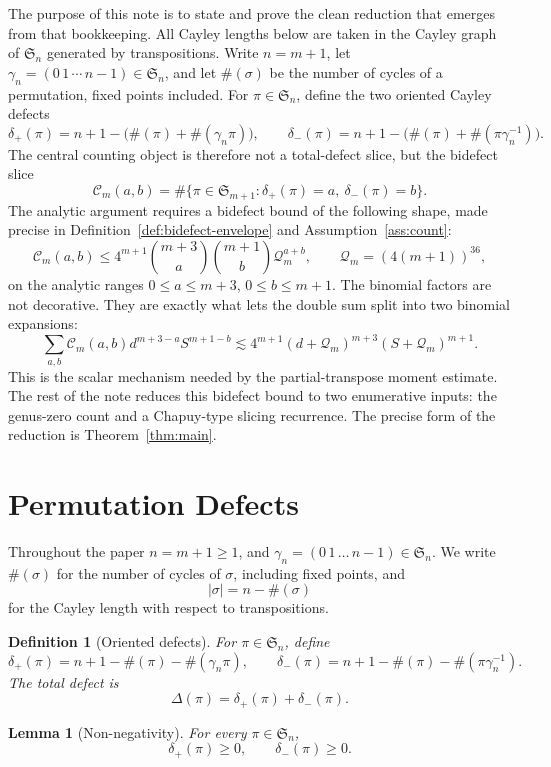 \documentclass[11pt]{article}
\numberwithin{equation}{section}
\newtheorem{lemma}[theorem]{Lemma}
\newtheorem{definition}[theorem]{Definition}
\newcommand{\Sym}{\mathfrak S}
\newcommand{\cyc}{\#}
\newcommand{\gammacyc}{\gamma_n}
\newcommand{\dplus}{\delta_+}
\newcommand{\dminus}{\delta_-}
\newcommand{\Dtot}{\Delta}
\newcommand{\Count}{\mathcal C}
\newcommand{\Qloss}{\mathcal Q}
\begin{document}
The purpose of this note is to state and prove the clean reduction that
emerges from that bookkeeping.  All Cayley lengths below are taken in the
Cayley graph of \(\Sym_n\) generated by transpositions.  Write \(n=m+1\), let
\(\gammacyc=(0\,1\,\cdots\,n-1)\in\Sym_n\), and let \(\cyc(\sigma)\) be the
number of cycles of a permutation, fixed points included.  For
\(\pi\in\Sym_n\), define the two oriented Cayley defects
\[
  \dplus(\pi)=n+1-\bigl(\cyc(\pi)+\cyc(\gammacyc\pi)\bigr),
  \qquad
  \dminus(\pi)=n+1-\bigl(\cyc(\pi)+\cyc(\pi\gammacyc^{-1})\bigr).
\]
The central counting object is therefore not a total-defect slice, but the
bidefect slice
\[
  \Count_m(a,b)
  =
  \#\{\pi\in\Sym_{m+1}:\dplus(\pi)=a,\ \dminus(\pi)=b\}.
\]
The analytic argument requires a bidefect bound of the following shape, made
precise in Definition~\ref{def:bidefect-envelope} and
Assumption~\ref{ass:count}:
\[
  \Count_m(a,b)
  \le
  4^{m+1}
  \binom{m+3}{a}
  \binom{m+1}{b}
  \Qloss_m^{a+b},
  \qquad
  \Qloss_m=(4(m+1))^{36},
\]
on the analytic ranges \(0\le a\le m+3\), \(0\le b\le m+1\).
The binomial factors are not decorative.  They are exactly what lets the
double sum split into two binomial expansions:
\[
\sum_{a,b}\Count_m(a,b)d^{m+3-a}S^{m+1-b}
\lesssim
4^{m+1}(d+\Qloss_m)^{m+3}(S+\Qloss_m)^{m+1}.
\]
This is the scalar mechanism needed by the partial-transpose moment estimate.
The rest of the note reduces this bidefect bound to two enumerative inputs:
the genus-zero count and a Chapuy-type slicing recurrence.  The precise form
of the reduction is Theorem~\ref{thm:main}.

\section{Permutation Defects}

Throughout the paper \(n=m+1\ge1\), and
\(\gammacyc=(0\,1\,\ldots\,n-1)\in\Sym_n\).  We write
\(\cyc(\sigma)\) for the number of cycles of \(\sigma\), including fixed
points, and
\[
  |\sigma|=n-\cyc(\sigma)
\]
for the Cayley length with respect to transpositions.

\begin{definition}[Oriented defects]
For \(\pi\in\Sym_n\), define
\[
  \dplus(\pi)=n+1-\cyc(\pi)-\cyc(\gammacyc\pi),
  \qquad
  \dminus(\pi)=n+1-\cyc(\pi)-\cyc(\pi\gammacyc^{-1}).
\]
The total defect is
\[
  \Dtot(\pi)=\dplus(\pi)+\dminus(\pi).
\]
\end{definition}

\begin{lemma}[Non-negativity]
For every \(\pi\in\Sym_n\),
\[
  \dplus(\pi)\ge0,
  \qquad
  \dminus(\pi)\ge0.
\]
\end{lemma}
\end{document}
